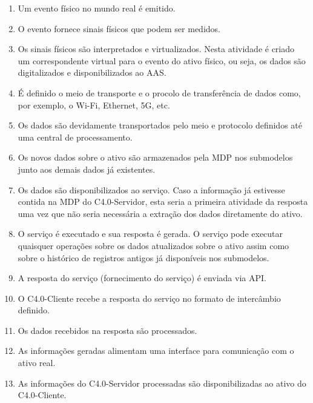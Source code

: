 \begin{enumerate}

	\item Um evento físico no mundo real é emitido.

	\item O evento fornece sinais físicos que podem ser medidos.

	\item Os sinais físicos são interpretados e virtualizados. Nesta atividade é criado um correspondente virtual para o evento do ativo físico, ou seja, os dados são digitalizados e disponibilizados ao AAS.

	\item É definido o meio de transporte e o procolo de transferência de dados como, por exemplo, o Wi-Fi, Ethernet, 5G, etc.

	\item Os dados são devidamente transportados pelo meio e protocolo definidos até uma central de processamento.

	\item Os novos dados sobre o ativo são armazenados pela MDP nos submodelos junto aos demais dados já existentes.

	\item Os dados são disponibilizados ao serviço. Caso a informação já estivesse contida na MDP do C4.0-Servidor, esta seria a primeira atividade da resposta uma vez que não seria necessária a extração dos dados diretamente do ativo.

	\item O serviço é executado e sua resposta é gerada. O serviço pode executar quaisquer operações sobre os dados atualizados sobre o ativo assim como sobre o histórico de registros antigos já disponíveis nos submodelos.

	\item A resposta do serviço (fornecimento do serviço) é enviada via API.

	\item O C4.0-Cliente recebe a resposta do serviço no formato de intercâmbio definido.

	\item Os dados recebidos na resposta são processados.

	\item As informações geradas alimentam uma interface para comunicação com o ativo real.

	\item As informações do C4.0-Servidor processadas são disponibilizadas ao ativo do C4.0-Cliente.
\end{enumerate}
